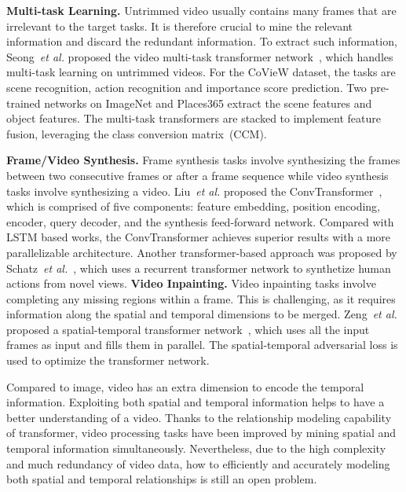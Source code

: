 \noindent\textbf{Multi-task Learning.} Untrimmed video usually contains many frames that are irrelevant to the target tasks. It is therefore crucial to mine the relevant information and discard the redundant information. To extract such information, Seong~\emph{et al.} proposed the video multi-task transformer network~, which handles multi-task learning on untrimmed videos. For the CoVieW dataset, the tasks are scene recognition, action recognition and importance score prediction. Two pre-trained networks on ImageNet and Places365 extract the scene features and object features. The multi-task transformers are stacked to implement feature fusion, leveraging the class conversion matrix~(CCM).

\noindent\textbf{Frame/Video Synthesis.} Frame synthesis tasks involve synthesizing the frames between two consecutive frames or after a frame sequence while video synthesis tasks involve synthesizing a video. Liu~\emph{et al.} proposed the ConvTransformer~, which is comprised of five components: feature embedding, position encoding, encoder, query decoder, and the synthesis feed-forward network. Compared with LSTM based works, the ConvTransformer achieves superior results with a more parallelizable architecture. Another transformer-based approach was proposed by Schatz~\emph{et al.}~, which uses a recurrent transformer network to synthetize human actions from novel views.
\noindent\textbf{Video Inpainting.} Video inpainting tasks involve completing any missing regions within a frame. This is challenging, as it requires information along the spatial and temporal dimensions to be merged. Zeng~\emph{et al.} proposed a spatial-temporal transformer network~, which uses all the input frames as input and fills them in parallel. The spatial-temporal adversarial loss is used to optimize the transformer network.

Compared to image, video has an extra dimension to encode the temporal information. Exploiting both spatial and temporal information helps to have a better understanding of a video. Thanks to the relationship modeling capability of transformer, video processing tasks have been improved by mining spatial and temporal information simultaneously. Nevertheless, due to the high complexity and much redundancy of video data, how to efficiently and accurately modeling both spatial and temporal relationships is still an open problem.

